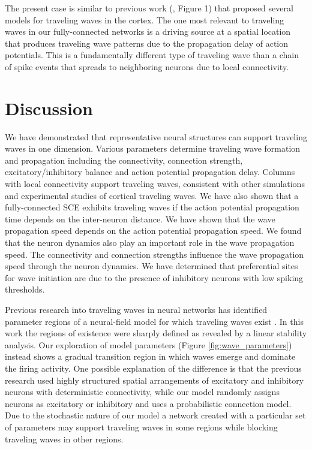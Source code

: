\documentclass[12pt]{article}
\begin{document}
The present case is similar to previous work (\parencite{ermentrout2001}, Figure 1) that proposed several models for traveling waves in the cortex.
The one most relevant to traveling waves in our fully-connected networks is a driving source at a spatial location that produces traveling wave patterns due to the propagation delay of action potentials.
This is a fundamentally different type of traveling wave than a chain of spike events that spreads to neighboring neurons due to local connectivity.

\section{Discussion}
We have demonstrated that representative neural structures can support traveling waves in one dimension.
Various parameters determine traveling wave formation and propagation including the connectivity, connection strength, excitatory/inhibitory balance and action potential propagation delay.
Columns with local connectivity support traveling waves, consistent with other simulations and experimental studies of cortical traveling waves.
We have also shown that  a fully-connected SCE exhibits traveling waves if the action potential propagation time depends on the inter-neuron distance. 
We have shown that the wave propagation speed depends on the action potential propagation speed.
We found that the neuron dynamics also play an important role in the wave propagation speed.
The connectivity and connection strengths influence the wave propagation speed through the neuron dynamics.
We have determined that preferential sites for wave initiation are due to the presence of inhibitory neurons with low spiking thresholds.

Previous research into traveling waves in neural networks has identified parameter regions of a neural-field model for which traveling waves exist \parencite{Senk2018}.
In this work the regions of existence were sharply defined as revealed by a linear stability analysis.
Our exploration of model parameters (Figure \ref{fig:wave_parameters}) instead shows a gradual transition region in which waves emerge and dominate the firing activity.
One possible explanation of the difference is that the previous research used highly structured spatial arrangements of excitatory and inhibitory neurons with deterministic connectivity, while our model randomly assigns neurons as excitatory or inhibitory and uses a probabilistic connection model.
Due to the stochastic nature of our model a network created with a particular set of parameters may support traveling waves in some regions while blocking traveling waves in other regions.
\end{document}
